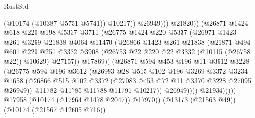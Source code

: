 \begin{lexlean}{RustStd}
\begin{coremodule}
                                    (@10174 (@10387 @5751 @5741))
                                    @10217))
                                @26949)))
                          @21820))
                      (@26871
                        @1424
                        @618
                        @220
                        @198
                        @5337
                        @3711
                        (@26775
                          @1424
                          @220
                          @5337
                          (@26971
                            @1423
                            @261
                            @3269
                            @21838
                            @4064
                            @11470
                            (@26866
                              @1423
                              @261
                              @21838
                              (@26871
                                @494
                                @601
                                @220
                                @251
                                @3332
                                @3908
                                (@26753 @22 @220 @22 @3332 (@10115 (@26758 @22)) @10629)
                                @27157))
                            @17869))
                        (@26871
                          @594
                          @453
                          @196
                          @11
                          @3612
                          @3228
                          (@26775
                            @594
                            @196
                            @3612
                            (@26993
                              @28
                              @515
                              @102
                              @196
                              @3269
                              @3372
                              @3234
                              @1658
                              (@26866
                                @515
                                @102
                                @3372
                                (@27083 @453 @72 @11 @3370 @3228 @27095 @26949))
                              @11782
                              @11785
                              @11788
                              @11791
                              @10217))
                          @26949))))
                  @21934)))))
        @17958
        (@10174 (@17964 @1478 @2047))
        @17970))
    (@13173 (@21563 @49))
    (@10174 (@21567 @12605 @716))

\end{coremodule}
\end{lexlean}

